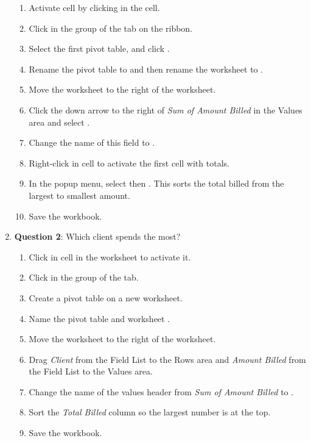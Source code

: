\begin{enumerate}
	\begin{enumerate}
		\item Activate cell  by clicking in the cell.
		\item Click  in the  group of the  tab on the ribbon.
		\item Select the first pivot table,  and click .
		\item Rename the pivot table to  and then rename the worksheet to .
		\item Move the  worksheet to the right of the  worksheet.
		\item Click the down arrow to the right of \textit{Sum of Amount Billed} in the Values area and select .
		\item Change the name of this field to .
		\item Right-click in cell  to activate the first cell with totals.
		\item In the popup menu, select  then . This sorts the total billed from the largest to smallest amount.
		\item Save the workbook.
	\end{enumerate}

	\item{\textbf{Question 2}: Which client spends the most?	}

	\begin{enumerate}
		\item Click in cell  in the  worksheet to activate it.
		\item Click  in the  group of the  tab.
		\item Create a pivot table on a new worksheet.
		\item Name the pivot table and worksheet .
		\item Move the  worksheet to the right of the  worksheet.
		\item Drag \textit{Client} from the Field List to the Rows area and \textit{Amount Billed} from the Field List to the Values area.
		\item Change the name of the values header from \textit{Sum of Amount Billed} to .
		\item Sort the \textit{Total Billed} column so the largest number is at the top.
		\item Save the workbook.
	\end{enumerate}


\end{enumerate}

